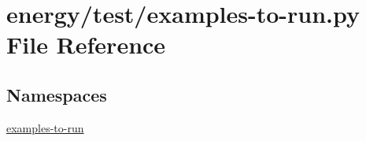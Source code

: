 \hypertarget{energy_2test_2examples-to-run_8py}{}\section{energy/test/examples-\/to-\/run.py File Reference}
\label{energy_2test_2examples-to-run_8py}
\subsection*{Namespaces}
\begin{DoxyCompactItemize}
\item 
 \hyperlink{namespaceexamples-to-run}{examples-\/to-\/run}
\end{DoxyCompactItemize}

